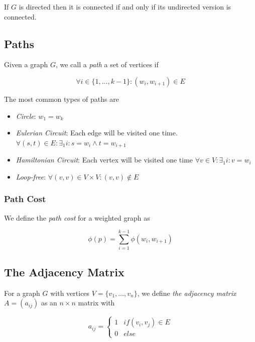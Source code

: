 If \(G\) is directed then it is connected if and only if its undirected version is connected.



\subsection{Paths}

Given a graph \(G\), we call a \emph{path} a set of vertices if 

\[
    \forall i \in \{1, \dots, k - 1\} : (w_i, w_{i + 1}) \in E
\]

The most common types of paths are 

\begin{itemize}

    \item \emph{Circle}: \(w_1 = w_k\)

    \item \emph{Eulerian Circuit}: Each edge will be visited one time. \(\forall(s,t) \in E : \exists_1 i: s = w_i \land t = w_{i + 1}\)

    \item \emph{Hamiltonian Circuit}: Each vertex will be visited one time \(\forall v \in V : \exists_1 i : v = w_i\) 

    \item \emph{Loop-free}: \(\forall(v,v) \in V \times V : (v,v) \notin E \)

\end{itemize}

\subsubsection{Path Cost}

We define the \emph{path cost} for a weighted graph as 

\[
    \phi (p) = \sum_{i = 1}^{k - 1} \phi(w_i, w_{i+1})
\]

\subsection{The Adjacency Matrix}

For a graph \(G\) with vertices \(V = \{v_1, \dots, v_n\}\), we define \emph{the adjacency matrix} \(A = (a_{ij})\) as an 
\(n \times n\) matrix with 

\[
    a_{ij} = \begin{cases}
        1 & if (v_i, v_j) \in E \\ 
        0 & else
    \end{cases}
\]

